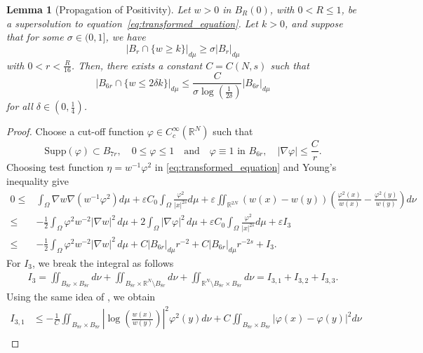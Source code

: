 \documentclass[11pt]{article}
\newtheorem{lemma}{Lemma}[section] %
\newcommand{\om} {\Omega}
\newcommand{\rnn}{\mathbb{R}^{N}}
\newcommand{\rtwon}{\mathbb{R}^{2N}}
\newcommand{\grad}{\nabla}
\begin{document}
\begin{lemma}[Propagation of Positivity]\label{lem:propagation_of_positivity}
Let \( w > 0 \) in \( B_R(0) \), with \( 0 < R \leq 1 \), be a supersolution to equation~\eqref{eq:transformed_equation}. Let \( k > 0 \), and suppose that for some \( \sigma \in (0,1] \), we have
\[
    |B_r \cap \{w \geq k\}|_{d\mu} \geq \sigma |B_r|_{d\mu}
\]
with \( 0 < r < \frac{R}{16} \). Then, there exists a constant \( C = C(N, s) \) such that
\[
    |B_{6r} \cap \{w \leq 2\delta k\}|_{d\mu} \leq \frac{C}{\sigma \log\left( \frac{1}{2\delta} \right)} |B_{6r}|_{d\mu}
\]
for all \( \delta \in \left(0, \frac{1}{4}\right) \).
\end{lemma}
\begin{proof}
Choose a cut-off function \( \varphi \in C_c^{\infty}(\rnn)\) such that 
\[
    \text{Supp}(\varphi) \subset B_{7r}, \quad 0 \leq \varphi \leq 1 \quad \text{and} \quad \varphi \equiv 1 \text{ in } B_{6r}, \quad |\nabla \varphi| \leq \frac{C}{r}.
\]
Choosing test function \( \eta = w^{-1} \varphi^2 \) in \eqref{eq:transformed_equation} and Young's inequality give
\begin{align*}
    0 \leq & \int_{\om} \grad w \nabla \left( w^{-1} \varphi^2 \right) d\mu + \varepsilon C_0 \int_{\om} \frac{\varphi^2}{|x|^{2s}} d\mu   +\varepsilon \iint_{\rtwon} \left( w(x) - w(y) \right) \left(  \frac{\varphi^2(x)}{w(x)} - \frac{\varphi^2(y)}{w(y)} \right) d\nu \\
    \leq & -\frac{1}{2} \int_{\om}  \varphi^2 w^{-2} |\nabla w|^2\, d\mu + 2 \int_{\om} |\nabla \varphi|^2 \,d\mu + \varepsilon C_0 \int_{\om} \frac{\varphi^2}{|x|^{2s}} d\mu   +\varepsilon I_3 \\
    \leq & -\frac{1}{2} \int_{\om}  \varphi^2 w^{-2} |\nabla w|^2\, d\mu + C  |B_{6r}|_{d\mu} r^{-2} + C |B_{6r}|_{d\mu} r^{-2s} + I_3.
\end{align*}
For \( I_3 \), we break the integral as follows
\begin{align*}
    I_3 = \iint_{B_{8r} \times B_{8r}} d\nu + \iint_{B_{8r} \times \mathbb{R}^N \setminus B_{8r}} d\nu + \iint_{\mathbb{R}^N \setminus B_{8r} \times B_{8r}} d\nu = I_{3,1} + I_{3,2} + I_{3,3}.
\end{align*}
Using the same idea of \cite[Lemma $1.3$]{palatucci_castro2016local}, we obtain
\begin{align*}
    I_{3,1} & \leq -\frac{1}{C} \iint_{B_{8r} \times B_{8r}} \left| \log \left(\frac{w(x)}{w(y)}\right) \right|^2 \varphi^2(y) d\nu + C \iint_{B_{8r} \times B_{8r}} \left| \varphi(x) - \varphi(y) \right|^2 d\nu \\

\end{align*}
\end{proof}
\end{document}
